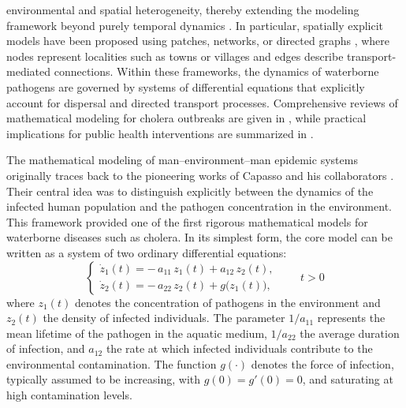 \documentclass[a4paper,11pt]{amsart}
\theoremstyle{definition}
\numberwithin{equation}{section}
\theoremstyle{definition}
\begin{document}
environmental and spatial heterogeneity, thereby extending the modeling framework
beyond purely temporal dynamics \cite{Bertuzzo2008, Bertuzzo2010, Righetto2013,
Mari2012}. In particular, spatially explicit models have been proposed using patches,
networks, or directed graphs \cite{Bertuzzo2007, Righetto2011, Casagrandi2006,
Bertuzzo2016}, where nodes represent localities such as towns or villages and edges
describe transport-mediated connections. Within these frameworks, the dynamics of
waterborne pathogens are governed by systems of differential equations that explicitly
account for dispersal and directed transport processes. Comprehensive reviews of
mathematical modeling for cholera outbreaks are given in \cite{Feng2016}, while
practical implications for public health interventions are summarized in \cite{Codeco2009}.


The mathematical modeling of man--environment--man epidemic systems originally traces back
to the pioneering works of Capasso and his collaborators
\cite{Capasso1978,Capasso1979,Capasso1982,Capasso1988,Capasso1997}.
Their central idea was to distinguish explicitly between the dynamics of the
infected human population and the pathogen concentration in the environment.
This framework provided one of the first rigorous mathematical models for
waterborne diseases such as cholera. In its simplest form, the core model can be written as a system of two ordinary
differential equations:
\begin{equation}\label{eq:capasso-ode}
\begin{cases}
\dot z_1(t) = -\,a_{11}\, z_1(t) + a_{12}\, z_2(t),\\[0.4em]
\dot z_2(t) = -\,a_{22}\, z_2(t) + g\!\big(z_1(t)\big),
\end{cases}\quad\quad t>0
\end{equation}
where $z_1(t)$ denotes the concentration of pathogens in the environment and
$z_2(t)$ the density of infected individuals. The parameter $1/a_{11}$
represents the mean lifetime of the pathogen in the aquatic medium,
$1/a_{22}$ the average duration of infection, and $a_{12}$ the rate at which
infected individuals contribute to the environmental contamination. The
function $g(\cdot)$ denotes the force of infection, typically assumed to be
increasing, with $g(0)=g'(0)=0$, and saturating at high contamination levels.
\end{document}
